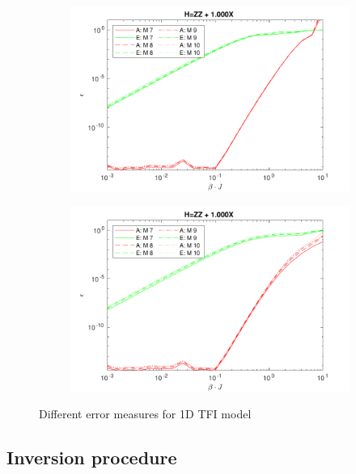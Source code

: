 \begin{figure}[!htbp]
    \begin{subfigure}[]{\linewidth}
        \includegraphics[width=\textwidth]{Figuren/benchmarking/comp_M_cycl.pdf}
    \end{subfigure}
    \begin{subfigure}[]{\linewidth}
        \includegraphics[width=\textwidth]{Figuren/benchmarking/Comp_M_lin.pdf}
    \end{subfigure}
    \caption{ Different error measures for 1D \Gls{TFI} model }
    \label{benchmarking:systemsize}
\end{figure}

\subsection{Inversion procedure}\label{subsec:inversion_procedure}

